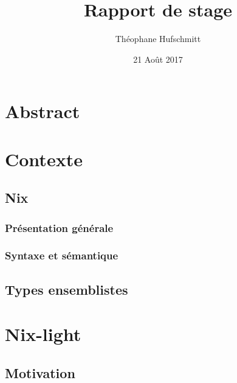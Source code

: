 \documentclass[frenchb]{scrartcl}
\title{Rapport de stage}
\author{Théophane Hufschmitt}
\date{21 Août 2017}
\newcommand{\τ}{\ensuremath{\tau}}
\begin{document}
\maketitle

\tableofcontents

\pagebreak

\section*{Abstract}

\section{Contexte}

\subsection{Nix}


\subsubsection{Présentation générale}


\subsubsection{Syntaxe et sémantique}


\subsection{Types ensemblistes}

\section{Nix-light} %

\subsection{Motivation}
\end{document}

